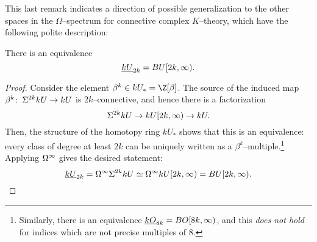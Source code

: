 This last remark indicates a direction of possible generalization to the other spaces in the $\Omega$--spectrum for connective complex $K$--theory, which have the following polite description:
\begin{lemma}
There is an equivalence \[\underline{\smash{kU}}_{2k} = BU[2k, \infty).\]
\end{lemma}
\begin{proof}
Consider the element $\beta^k \in kU_* = \Z[\beta]$.  The source of the induced map $\beta^k\colon\thinspace \Sigma^{2k} kU \to kU$ is $2k$--connective, and hence there is a factorization \[\Sigma^{2k} kU \to kU[2k, \infty) \to kU.\]  Then, the structure of the homotopy ring $kU_*$ shows that this is an equivalence: every class of degree at least $2k$ can be uniquely written as a $\beta^k$--multiple.\footnote{Similarly, there is an equivalence $\underline{\smash{kO}}_{8k} = BO[8k, \infty)$, and this \emph{does not hold} for indices which are not precise multiples of $8$.}  Applying $\Omega^\infty$ gives the desired statement: \[\underline{\smash{kU}}_{2k} = \Omega^\infty \Sigma^{2k} kU \simeq \Omega^\infty kU[2k, \infty) = BU[2k, \infty). \qedhere\]
\end{proof}

